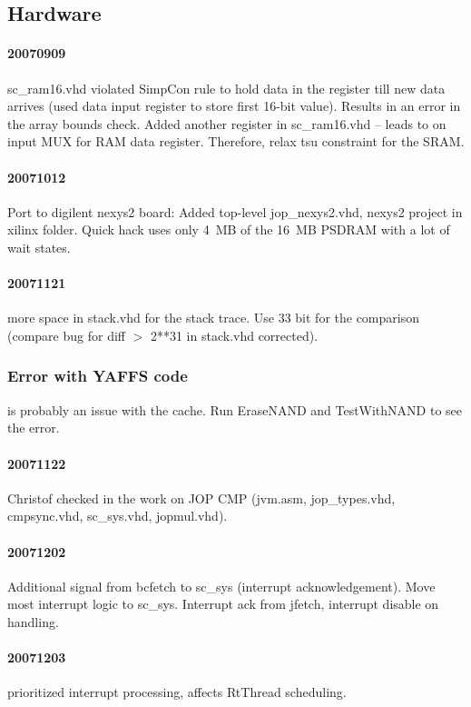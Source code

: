 \documentclass[a4paper,12pt]{scrartcl}
\newcommand{\code}[1]{{\textsf{#1}}}
\begin{document}
\subsection{Hardware}

\paragraph{20070909} sc\_ram16.vhd violated SimpCon rule to hold data in the
register till new data arrives (used data input register to store
first 16-bit value). Results in an error in the array bounds check.
Added another register in sc\_ram16.vhd -- leads to on input MUX for
RAM data register. Therefore, relax tsu constraint for the SRAM.

\paragraph{20071012} Port to digilent nexys2 board: Added top-level
jop\_nexys2.vhd, nexys2 project in xilinx folder. Quick hack uses
only 4~MB of the 16~MB PSDRAM with a lot of wait states.

\paragraph{20071121} more space in stack.vhd for the stack
trace. Use 33 bit for the comparison (compare bug for diff $>$
2**31 in stack.vhd corrected).

\subsubsection{Error with YAFFS code} is probably an issue with
the cache. Run EraseNAND and TestWithNAND to see the error.

\paragraph{20071122} Christof checked in the work on JOP CMP
(jvm.asm, jop\_types.vhd, cmpsync.vhd, sc\_sys.vhd,
jopmul.vhd).

\paragraph{20071202} Additional signal from \code{bcfetch} to
\code{sc\_sys} (interrupt acknowledgement). Move most interrupt
logic to \code{sc\_sys}. Interrupt ack from \code{jfetch},
interrupt disable on handling.

\paragraph{20071203} prioritized interrupt processing, affects
RtThread scheduling.
\end{document}
